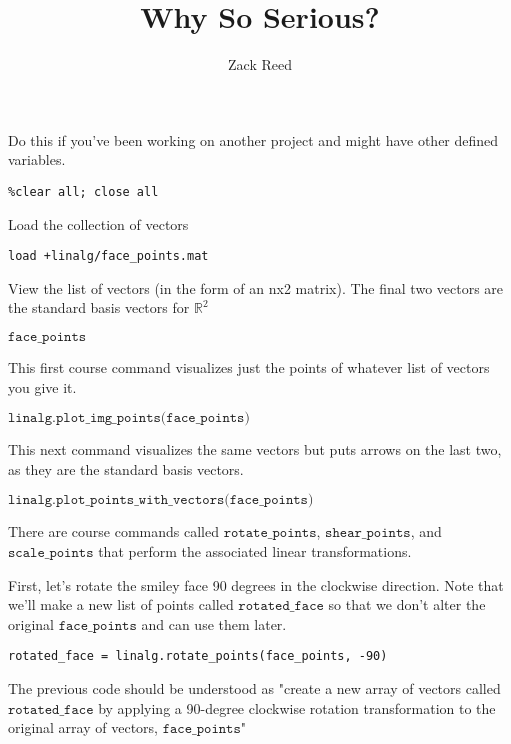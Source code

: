 \documentclass{ximera}
\author{Zack Reed}
\title{Why So Serious?}
\begin{document}
\begin{abstract}


\end{abstract}
\maketitle

\begin{exploration}

Do this if you've been working on another project and might have other defined variables.
\begin{verbatim}
%clear all; close all
\end{verbatim}

Load the collection of vectors
\begin{verbatim}load +linalg/face_points.mat\end{verbatim}

View the list of vectors (in the form of an nx2 matrix). The final two vectors are the standard basis vectors for \(\mathbb{R}^2\)

$\texttt{face\_points}$

This first course command visualizes just the points of whatever list of vectors you give it.

$\texttt{linalg.plot\_img\_points(face\_points)}$

This next command visualizes the same vectors but puts arrows on the last two, as they are the standard basis vectors.

$\texttt{linalg.plot\_points\_with\_vectors(face\_points)}$

There are course commands called $\texttt{rotate\_points}$, $\texttt{shear\_points}$, and $\texttt{scale\_points}$ that perform the associated linear transformations.

First, let's rotate the smiley face 90 degrees in the clockwise direction. Note that we'll make a new list of points called $\texttt{rotated\_face}$ so that we don't alter the original $\texttt{face\_points}$ and can use them later.
\begin{verbatim}
rotated_face = linalg.rotate_points(face_points, -90)
\end{verbatim}

The previous code should be understood as "create a new array of vectors called $\texttt{rotated\_face}$ by applying a 90-degree clockwise rotation transformation to the original array of vectors, $\texttt{face\_points}$"


\end{exploration}
\end{document}
